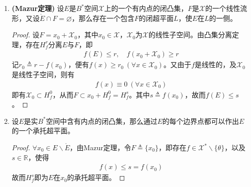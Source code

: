 \begin{enumerate}[leftmargin=2cm, label=\arabic*]
		\item \textbf{(Mazur定理)} 设$E$是$B^*$空间$\mathscr{X}$上的一个有内点的闭凸集，$F$是$\mathscr{X}$的一个线性流形，又设$\mathring{E}\cap F=\varnothing$，那么存在一个包含$F$的闭超平面$L$，使$E$在$L$的一侧。
		\begin{proof}
			设$F = x_0+\mathscr{X}_0$，其中$x_0\in\mathscr{X}$，$\mathscr{X}_0$为$\mathscr{X}$的线性子空间。由凸集分离定理，存在$H_f^r$分离$E$与$F$，即
			\begin{align*}
				f(E)\leqslant r,\quad f(x_0+\mathscr{X}_0) \geqslant r
			\end{align*}
			记$r_0\triangleq r - f(x_0)$，便有$f(x)\geqslant r_0\ (\forall x\in \mathscr{X}_0)$。又由于$f$是线性的，及$\mathscr{X}_0$是线性子空间，则有
			\begin{align*}
				f(x) \equiv 0 \ (\forall x\in\mathscr{X}_0)
			\end{align*}
			即有$\mathscr{X}_0 \subset H_f^0$，从而$F\subset x_0+H_f^0 = H_f^s$。其中$s \triangleq f(x_0)$，故而$f(E)\leqslant s$。
		\end{proof}
		
		\item 设$E$是实$B^*$空间中含有内点的闭凸集，那么通过$E$的每个边界点都可以作出$E$的一个承托超平面。
		\begin{proof}
			$\forall x_0\in E\backslash \mathring{E}$，由Mazur定理，令$F\triangleq \{x_0\}$，即存在$f\in\mathscr{X}^*\backslash\{\theta\}$，以及$s\in\mathbb{R}$，使得
			\begin{align*}
				f(x) \leqslant s = f(x_0)
			\end{align*}
			故而$H_f^s$即为$E$在$x_0$的承托超平面。
		\end{proof}
	\end{enumerate}
	
